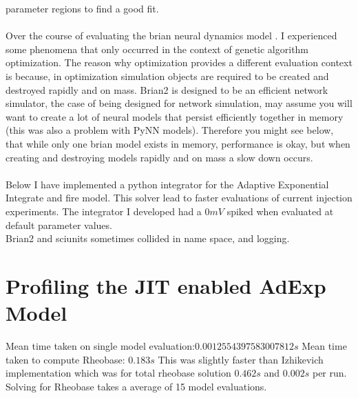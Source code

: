 parameter regions to find a good fit.\\
\\
Over the course of evaluating the brian neural dynamics model \cite{gerstner2014neuronal}. I experienced some phenomena that only occurred in the context of genetic algorithm optimization. The reason why optimization provides a different evaluation context is because, in optimization simulation objects are required to be created and destroyed rapidly and on mass. Brian2 is designed to be an efficient network simulator, the case of being designed for network simulation, may assume you will want to create a lot of neural models that persist efficiently together in memory (this was also a problem with PyNN models). Therefore you might see below, that while only one brian model exists in memory, performance is okay, but when creating and destroying models rapidly and on mass a slow down occurs.\\
\\
Below I have implemented a python integrator for the Adaptive
Exponential Integrate and fire model. This solver lead to faster
evaluations of current injection experiments. The integrator I developed
had a $0mV$ spiked when evaluated at default
parameter values.\\


Brian2 and sciunits sometimes collided in name space, and logging.

\section{Profiling the JIT enabled AdExp Model}
Mean time taken on single model evaluation:$ 0.0012554397583007812s $
Mean time taken to compute Rheobase:
$0.183s $
This was slightly faster than Izhikevich implementation which was for total rheobase solution $ 0.462s $ and $  0.002 s$ per run. Solving for Rheobase takes a average of 15 model evaluations.



